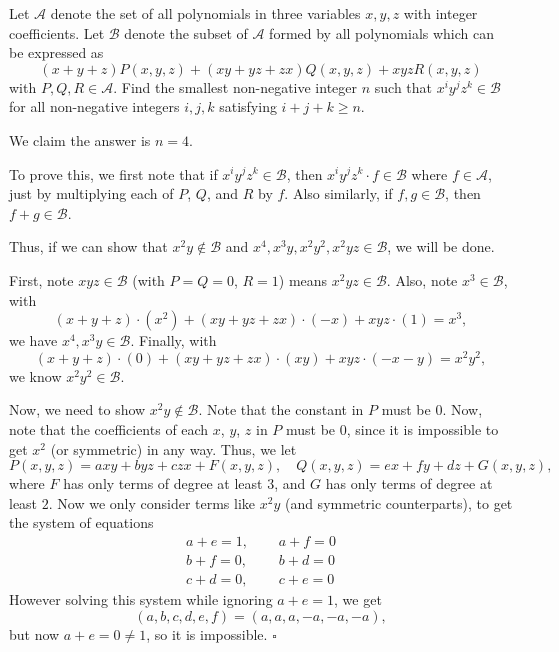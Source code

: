 
\begin{problem}[ISL 2020 A2]
    Let $\mathcal A$ denote the set of all polynomials in three variables $x,y,z$
    with integer coefficients. Let $\mathcal B$ denote the subset of $\mathcal A$
    formed by all polynomials which can be expressed as
    \[ (x+y+z)P(x,y,z) + (xy+yz+zx)Q(x,y,z) + xyzR(x,y,z) \]
    with $P,Q,R \in \mathcal A$. Find the smallest non-negative integer $n$ such
    that $x^i y^j z^k \in \mathcal B$ for all non-negative integers $i, j, k$
    satisfying $i + j + k \geq n$.
\end{problem}

\begin{solution}[Ritwin]
    We claim the answer is $n = 4$.
    
    To prove this, we first note that if $x^iy^jz^k \in \mathcal B$, then
    $x^iy^jz^k \cdot f \in \mathcal B$ where $f \in \mathcal A$, just by
    multiplying each of $P$, $Q$, and $R$ by $f$. Also similarly, if
    $f, g \in \mathcal B$, then $f+g \in \mathcal B$.
    
    Thus, if we can show that $x^2y \not\in \mathcal B$ and
    $x^4, x^3y, x^2y^2, x^2yz \in \mathcal B$, we will be done.
    
    First, note $xyz \in \mathcal B$ (with $P = Q = 0$, $R = 1$) means
    $x^2yz \in \mathcal B$. Also, note $x^3 \in \mathcal B$, with
    \[(x+y+z) \cdot (x^2) + (xy+yz+zx) \cdot (-x) + xyz \cdot (1) = x^3,\]
    we have $x^4, x^3y \in \mathcal B$. Finally, with
    \[(x+y+z) \cdot (0) + (xy+yz+zx) \cdot (xy) + xyz \cdot (-x-y) = x^2y^2,\]
    we know $x^2y^2 \in \mathcal B$.
    
    Now, we need to show $x^2y \not\in \mathcal B$. Note that the constant in
    $P$ must be $0$. Now, note that the coefficients of each $x$, $y$, $z$ in
    $P$ must be $0$, since it is impossible to get $x^2$ (or symmetric) in any
    way. Thus, we let \[P(x,y,z) = axy + byz + czx + F(x,y,z), \quad Q(x,y,z) = ex + fy + dz + G(x,y,z),\]
    where $F$ has only terms of degree at least $3$, and $G$ has only terms of
    degree at least $2$. Now we only consider terms like $x^2y$ (and symmetric
    counterparts), to get the system of equations \begin{align*}
        a+e=1,~~~ & ~~~a+f=0\\
        b+f=0,~~~ & ~~~b+d=0\\
        c+d=0,~~~ & ~~~c+e=0
    \end{align*}
    However solving this system while ignoring $a+e=1$, we get
    \[(a,b,c,d,e,f) = (a,a,a,-a,-a,-a),\]
    but now $a+e=0\neq1$, so it is impossible. $\square$
\end{solution}
